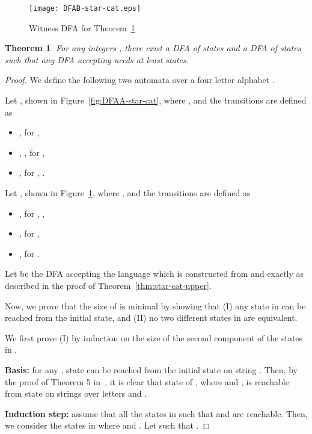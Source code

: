 \documentclass[10pt]{article}
\newtheorem{theorem}{Theorem}
\begin{document}
\begin{figure}[ht]
  \begin{center}
  \texttt{[image: DFAB-star-cat.eps]}
  \end{center}
  \caption{Witness DFA  for Theorem~\ref{thm:star-cat-lower}}
\label{fig:DFAB-star-cat}
\end{figure}


\begin{theorem}\label{thm:star-cat-lower}
For any integers , there exist a DFA  of  states and a DFA  of  states such that any DFA accepting  needs at least  states.
\end{theorem}
\begin{proof}
We define the following two automata over a four letter alphabet .

Let , shown in Figure~\ref{fig:DFAA-star-cat}, where , and the transitions are defined as
    \begin{itemize}
    \item , for ,
    \item , , for ,
    \item , for , .
    \end{itemize}

Let , shown in Figure~\ref{fig:DFAB-star-cat}, where , and the transitions are defined as
    \begin{itemize}
    \item , for , ,
    \item , for ,
    \item , for .
    \end{itemize}

    Let  be the DFA accepting the language  which is constructed from  and  exactly as described in the proof of Theorem~\ref{thm:star-cat-upper}.

    Now, we prove that the size of  is minimal by showing that (I) any state in  can be reached from the initial state, and (II) no two different states in  are equivalent.

    We first prove (I) by induction on the size of the second component  of the states in .

    {\bf Basis:} for any , state  can be reached from the initial state  on string .
    Then, by the proof of Theorem 5 in~\cite{YuZhSa94}, it is clear that state  of , where  and , is reachable from state  on strings over letters  and .

    {\bf Induction step:} assume that all the states  in  such that  and  are reachable.
    Then, we consider the states  in  where  and .
    Let  such that .


\end{proof}
\end{document}
